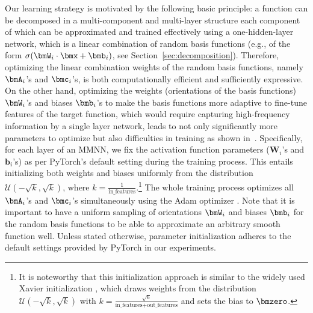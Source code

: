 \documentclass[review,hidelinks,onefignum,onetabnum]{siamart250211}
\begin{document}
Our learning strategy is motivated by the following basic principle: a function can be decomposed in a multi-component and multi-layer structure each component of which can be approximated and trained effectively using a one-hidden-layer network, which is a linear combination of random basis functions (e.g., of the form $\sigma(\bmW_i\cdot \bmx + \bmb_i)$, see Section~\ref{sec:decomposition}).
Therefore, optimizing the linear combination weights of the random basis functions, namely $\bmA_i$'s and $\bmc_i$'s, is both computationally efficient and sufficiently expressive.
On the other hand, optimizing the weights (orientations of the basis functions) $\bmW_i$'s and biases $\bmb_i$'s to make the basis functions more adaptive to fine-tune features of the target function, which would require capturing high-frequency information by a single layer network, leads to not only significantly more parameters to optimize but also difficulties in training as shown in~\cite{ZZZZ-23}.
Specifically, for each layer of an MMNN, we fix the activation function parameters (\(\bm{W}_i\)'s and \(\bm{b}_i\)'s) as per PyTorch's default setting during the training process. This entails initializing both weights and biases uniformly from the distribution \(\mathcal{U}(-\sqrt{k}, \sqrt{k})\), where \(k = \frac{1}{\text{in\_features}}\).\footnote{It is noteworthy that this initialization approach is similar to the widely used Xavier initialization \cite{pmlr-v9-glorot10a}, which draws weights from the distribution \(\mathcal{U}(-\sqrt{k}, \sqrt{k})\) with \(k = \frac{\sqrt{6}}{\text{in\_features} + \text{out\_features}}\) and sets the bias to $\bmzero$.}
The whole training process optimizes all \(\bmA_i\)'s and \(\bmc_i\)'s simultaneously using the Adam optimizer \cite{DBLP:journals/corr/KingmaB14}. Note that it is important to have a uniform sampling of orientations $\bmW_i$ and biases $\bmb_i$ for the random basis functions to be able to approximate an arbitrary smooth function well. Unless stated otherwise, parameter initialization adheres to the default settings provided by PyTorch in our experiments.
\end{document}
